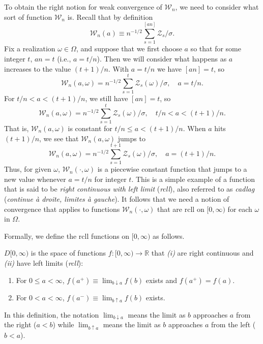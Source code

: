 To obtain the right notion for weak convergence of $\mathcal{W}_n$, we need to consider what sort of function $\mathcal{W}_n$ is. Recall that by definition
\[
\mathcal{W}_n(a) \equiv n^{-1/2}\sum_{s=1}^{[an]} \mathcal{Z}_s / \sigma.
\]
Fix a realization $\omega \in \Omega$, and suppose that we first choose $a$ so that for some integer $t$, $an = t$ (i.e., $a = t/n$). Then we will consider what happens as $a$ increases to the value $(t+1)/n$. With $a = t/n$ we have $[an] = t$, so
\[
\mathcal{W}_n(a, \omega) = n^{-1/2}\sum_{s=1}^{t} \mathcal{Z}_s(\omega)/\sigma, \quad a = t/n.
\]
For $t/n < a < (t+1)/n$, we still have $[an] = t$, so
\[
\mathcal{W}_n(a, \omega) = n^{-1/2}\sum_{s=1}^{t} \mathcal{Z}_s(\omega)/\sigma, \quad t/n < a < (t+1)/n.
\]
That is, $\mathcal{W}_n(a, \omega)$ is constant for $t/n \leq a < (t+1)/n$. When $a$ hits $(t+1)/n$, we see that $\mathcal{W}_n(a, \omega)$ jumps to
\[
\mathcal{W}_n(a, \omega) = n^{-1/2}\sum_{s=1}^{t+1} \mathcal{Z}_s(\omega)/\sigma, \quad a = (t+1)/n.
\]
Thus, for given $\omega$, $\mathcal{W}_n(\cdot, \omega)$ is a piecewise constant function that jumps to a new value whenever $a = t/n$ for integer $t$. This is a simple example of a function that is said to be \emph{right continuous with left limit} (\emph{rcll}), also referred to as \emph{cadlag} (\emph{continue \`{a} droite, limites \`{a} gauche}). It follows that we need a notion of convergence that applies to functions $\mathcal{W}_n(\cdot, \omega)$ that are rcll on $[0,\infty)$ for each $\omega$ in $\Omega$.

Formally, we define the rcll functions on $[0,\infty)$ as follows.

\begin{definition}[rcll]\label{def:rcll}
$D[0,\infty)$ is the space of functions $f : [0,\infty) \to \mathbb{R}$ that \emph{(i)} are right continuous and \emph{(ii)} have left limits (\emph{rcll}):
\begin{enumerate}[label=(\roman*)]
\item For $0 \leq a < \infty$, $f(a^+) \equiv \lim_{b \downarrow a} f(b)$ exists and $f(a^+) = f(a)$.
\item For $0 < a < \infty$, $f(a^-) \equiv \lim_{b \uparrow a} f(b)$ exists.
\end{enumerate}
\end{definition}

In this definition, the notation $\lim_{b \downarrow a}$ means the limit as $b$ approaches $a$ from the right ($a < b$) while $\lim_{b \uparrow a}$ means the limit as $b$ approaches $a$ from the left ($b < a$).

